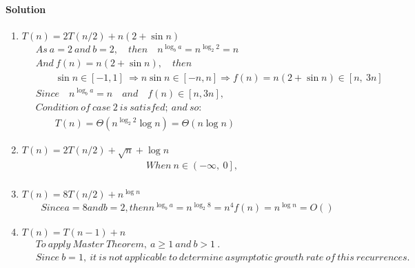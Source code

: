 \documentclass[a4paper]{scrartcl}
\begin{document}
\paragraph{Solution}
\begin{enumerate}[label=(\alph*)]
  \item $T (n) = 2T (n/2) + n(2 + \sin{n})$
\begin{align*}
  &\ As\ a = 2\ and\ b = 2,\quad then \quad n^{\log_b{a}} = n^{\log_2{2}} = n\\
  &\ And\ f(n) = n(2 + \sin{n}),\quad then\\ &\
  \qquad \sin{n} \in \left[-1, 1\right]\ \Rightarrow n\sin{n} \in \left[-n, n\right] \Rightarrow f(n) = n\left(2 + \sin{n}\right) \in \left[n,\ 3n\right]\\ &\
  Since\quad n^{\log_b{a}} = n \quad and \quad f(n) \in \left[n,3n\right],\\ &\
  Condition\ of\ case\ 2\ is\ satisfed;\ and\ so:\\
  &\ \qquad T(n)=\Theta\left({n^{\log_2{2}}\log{n}}\right) =\Theta\left({n\log{n}}\right)
\end{align*}
\item $T (n) = 2T (n/2) + \sqrt{n} + \log{n}$
\begin{align*}
  &\ When\ n \in \left(-\infty,\ 0\right], \\ &\
\end{align*}
\item $T (n) = 8T (n/2) + n^{\log{n}}$
\begin{align*}
  Since a = 8 and b = 2, then
  n^{\log_b{a}} = n^{\log_2{8}} = n^4
  f(n) = n^{\log{n}} = O()
\end{align*}
\item $T (n) = T (n - 1) + n$
\begin{align*}
  &\ To\ apply\ Master\ Theorem,\ a \geq 1\ and\ b > 1\ .\\
  &\ Since\ b = 1,\ it\ is\ not\ applicable\ to\ determine\ asymptotic\ growth\ rate\ of\ this\ recurrences.
\end{align*}
\end{enumerate}
\end{document}
